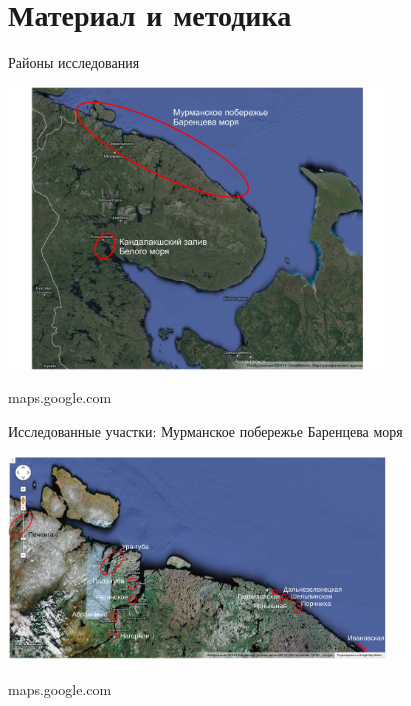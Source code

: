 \documentclass{beamer}
\begin{document}
\section*{Материал и методика}

\begin{frame}{Районы исследования}
\begin{center}
\includegraphics[width=100mm]{./northwest.pdf}

\tiny{maps.google.com}
\end{center}
\end{frame}


\begin{frame}{Исследованные участки: Мурманское побережье Баренцева моря}
\begin{center}
\includegraphics[width=100mm]{./Murman.pdf}

\tiny{maps.google.com}
\end{center}
\end{frame}
\end{document}
